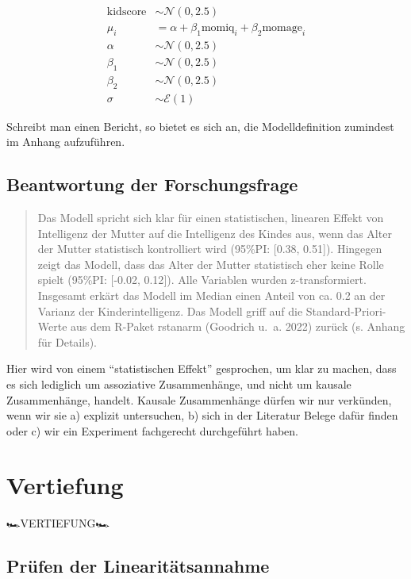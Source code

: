 \documentclass[
  a4paper,
  DIV=11]{scrreprt}
\theoremstyle{definition}
\theoremstyle{remark}
\begin{document}
\[
\begin{aligned}
\text{kidscore}  &\sim \mathcal{N}(0,2.5)\\
\mu_i &= \alpha + \beta_1\text{momiq}_i + \beta_2\text{momage}_i \\
\alpha &\sim \mathcal{N}(0,2.5)\\
\beta_1 &\sim \mathcal{N}(0,2.5)\\
\beta_2 &\sim \mathcal{N}(0,2.5)\\
\sigma &\sim \mathcal{E}(1)
\end{aligned}
\]

Schreibt man einen Bericht, so bietet es sich an, die Modelldefinition
zumindest im Anhang aufzuführen.

\hypertarget{beantwortung-der-forschungsfrage-1}{%
\subsection{Beantwortung der
Forschungsfrage}\label{beantwortung-der-forschungsfrage-1}}

\begin{quote}
Das Modell spricht sich klar für einen statistischen, linearen Effekt
von Intelligenz der Mutter auf die Intelligenz des Kindes aus, wenn das
Alter der Mutter statistisch kontrolliert wird (95\%PI: {[}0.38,
0.51{]}). Hingegen zeigt das Modell, dass das Alter der Mutter
statistisch eher keine Rolle spielt (95\%PI: {[}-0.02, 0.12{]}). Alle
Variablen wurden z-transformiert. Insgesamt erkärt das Modell im Median
einen Anteil von ca. 0.2 an der Varianz der Kinderintelligenz. Das
Modell griff auf die Standard-Priori-Werte aus dem R-Paket rstanarm
(Goodrich u.~a. 2022) zurück (s. Anhang für Details).
\end{quote}

Hier wird von einem ``statistischen Effekt'' gesprochen, um klar zu
machen, dass es sich lediglich um assoziative Zusammenhänge, und nicht
um kausale Zusammenhänge, handelt. Kausale Zusammenhänge dürfen wir nur
verkünden, wenn wir sie a) explizit untersuchen, b) sich in der
Literatur Belege dafür finden oder c) wir ein Experiment fachgerecht
durchgeführt haben.

\hypertarget{vertiefung-2}{%
\section{Vertiefung}\label{vertiefung-2}}

🏎️VERTIEFUNG🏎️

\hypertarget{pruxfcfen-der-linearituxe4tsannahme}{%
\subsection{Prüfen der
Linearitätsannahme}\label{pruxfcfen-der-linearituxe4tsannahme}}
\end{document}
